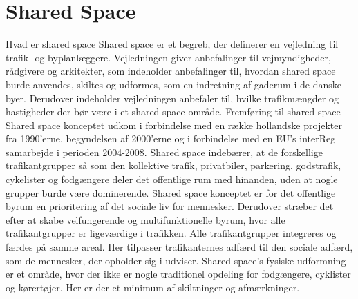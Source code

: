 \section{Shared Space}
\label{sec:shared_space}
Hvad er shared space
Shared space er et begreb, der definerer en vejledning til trafik- og byplanlæggere. Vejledningen giver anbefalinger til vejmyndigheder, rådgivere og arkitekter, som indeholder anbefalinger til, hvordan shared space burde anvendes, skiltes og udformes, som en indretning af gaderum i de danske byer. Derudover indeholder vejledningen anbefaler til, hvilke trafikmængder og hastigheder der bør være i et shared space område.
Fremføring til shared space
Shared space konceptet udkom i forbindelse med en række hollandske projekter fra 1990’erne, begyndelsen af 2000’erne og i forbindelse med en EU’s interReg samarbejde i perioden 2004-2008.
Shared space indebærer, at de forskellige trafikantgrupper så som den kollektive trafik, privatbiler, parkering, godstrafik, cykelister og fodgængere deler det offentlige rum med hinanden, uden at nogle grupper burde være dominerende. Shared space konceptet er for det offentlige byrum en prioritering af det sociale liv for mennesker. Derudover stræber det efter at skabe velfungerende og multifunktionelle byrum, hvor alle trafikantgrupper er ligeværdige i trafikken. Alle trafikantgrupper integreres og færdes på samme areal. Her tilpasser trafikanternes adfærd til den sociale adfærd, som de mennesker, der opholder sig i udviser. Shared space’s fysiske udformning er et område, hvor der ikke er nogle traditionel opdeling for fodgængere, cyklister og kørertøjer. Her er der et minimum af skiltninger og afmærkninger.


